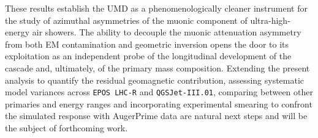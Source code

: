 \documentclass[11pt,a4paper]{article}
\begin{document}
These results establish the UMD as a phenomenologically cleaner instrument for the study of azimuthal asymmetries of the muonic component of ultra-high-energy air showers. The ability to decouple the muonic attenuation asymmetry from both EM contamination and geometric inversion opens the door to its exploitation as an independent probe of the longitudinal development of the cascade and, ultimately, of the primary mass composition. Extending the present analysis to quantify the residual geomagnetic contribution, assessing systematic model variances across \texttt{EPOS\,LHC-R} and \texttt{QGSJet-III.01}, comparing between other primaries and energy ranges and incorporating experimental smearing to confront the simulated response with AugerPrime data are natural next steps and will be the subject of forthcoming work.

\newpage


\end{document}
